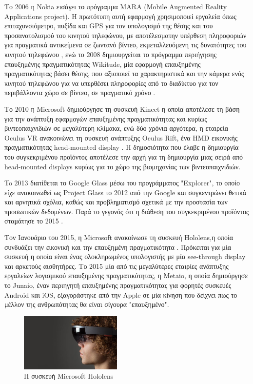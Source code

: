 Το 2006 η Nokia εισάγει το πρόγραμμα MARA (Mobile Augmented Reality Applications project). H πρωτότυπη αυτή εφαρμογή χρησιμοποιεί εργαλεία όπως επιταχυνσιόμετρο, πυξίδα και GPS για τον υπολογισμό της θέσης και του προσανατολισμού του κινητού τηλεφώνου, με αποτέλεσματην υπέρθεση πληροφοριών για πραγματικά αντικείμενα σε ζωντανό βίντεο, εκμεταλλευόμενη τις δυνατότητες του κινητού τηλεφώνου \cite{kahari2006mara}, ενώ το 2008 δημιουργείται το πρόγραμμα περιήγησης επαυξημένης πραγματικότητας Wikitude, μία εφαρμογή επαυξημένης πραγματικότητας βάσει θέσης, που αξιοποιεί τα χαρακτηριστικά και την κάμερα ενός κινητού τηλεφώνου για να υπερθέσει πληροφορίες από το διαδίκτυο για τον περιβάλλοντα χώρο σε βίντεο, σε πραγματικό χρόνο \cite{wikitude}.


Το 2010 η Microsoft δημιούργησε τη συσκευή Kinect η οποία αποτέλεσε τη βάση για την ανάπτυξη εφαρμογών επαυξημένης πραγματικότητας \cite{zhang2012microsoft} και κυρίως βιντεοπαιχνιδιών σε μεγαλύτερη κλίμακα, ενώ δύο χρόνια αργότερα, η εταιρεία Oculus VR ανακοινώνει τη συσκευή ανάπτυξης Oculus Rift, ένα HMD εικονικής πραγματικότητας head-mounted display \cite{oculus}. Η δημοσιότητα που έλαβε η δημιουργία του συγκεκριμένου προϊόντος αποτέλεσε την αρχή για τη δημιουργία μιας σειρά από head-mounted displays κυρίως για το χώρο της βιομηχανίας των βιντεοπαιχνιδιών.


To 2013 διατίθεται το Google Glass μέσω του προγράμματος "Explorer", το οποίο είχε ανακοινωθεί ως Project Glass το 2012 από την Google και συγκεντρώνει θετικά και αρνητικά σχόλια, καθώς και προβληματισμό σχετικά με την προστασία των προσωπικών δεδομένων. Παρά το γεγονός ότι η διάθεση του συγκεκριμένου προϊόντος σταμάτησε το 2015 \cite{glass}.


Τον Ιανουάριο του 2015, η Microsoft ανακοίνωσε τη συσκευή Hololens,η οποία συνδυάζει την εικονική και την επαυξημένη πραγματικότητα \cite{hololens}. Πρόκειται για μία συσκευή η οποία είναι ένας ολοκληρωμένος υπολογιστής με μία see-through display και αρκετούς αισθητήρες. Το 2015 μία από τις μεγαλύτερες εταιρίες ανάπτυξης εργαλείων λογισμικού επαυξημένης πραγματικότητας, η Metaio, η οποία δημιούργησε το Junaio, έναν περιηγητή επαυξημένης πραγματικότητας για φορητές συσκευές Android και iOS, εξαγοράστηκε από την Apple σε μία κίνηση\cite{applemetaio} που δείχνει πως το μέλλον της ανθρωπότητας θα είναι σίγουρα "επαυξημένο". 


\begin{figure}[H]
    \centering
    \includegraphics[width=0.45\textwidth]{Files/Figures/hololens.jpg}
    \caption[Η συσκευή Microsoft Hololens]{Η συσκευή Microsoft Hololens}
    \label{fig:hud}
\end{figure}



